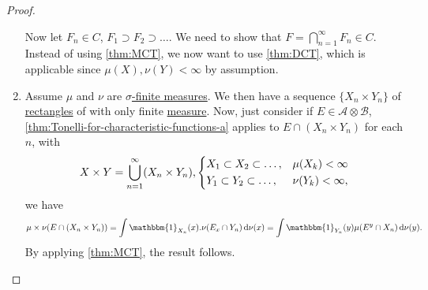 \begin{proof}
\begin{enumerate}
		      Now let \(F_{n} \in C\), \(F_1\supset F_2\supset \dots  \). We need to show that \(F = \bigcap_{n=1}^{\infty} F_{n} \in C\). Instead of using \autoref{thm:MCT}, we now want to use \autoref{thm:DCT}, which is applicable since \(\mu (X), \nu (Y)< \infty \) by assumption.
		\item Assume \(\mu\) and \(\nu \) are \hyperref[def:sigma-finite-measure]{\(\sigma \)-finite measures}. We then have a sequence \(\{X_n \times Y_n\}\) of \hyperref[def:rectangle]{rectangles} of with only finite \hyperref[def:measure]{measure}. Now, just consider if \(E\in \mathcal{A} \otimes \mathcal{B} \), \autoref{thm:Tonelli-for-characteristic-functions-a} applies to \(E \cap (X_{n} \times Y_{n} )\) for each \(n\), with
		      \[
			      X\times Y = \bigcup_{n=1}^{\infty} (X_{n} \times Y_{n} ), \begin{dcases}
				      X_1\subset X_2\subset \dots , & \mu (X_{k} )< \infty   \\
				      Y_1\subset Y_2\subset \dots , & \nu (Y_{k} )< \infty ,
			      \end{dcases}
		      \]
		      we have
		      \[
			      \mu \times \nu (E \cap (X_{n} \times Y_{n} )) = \int \mathbbm{1}_{X_{n} } (x) . \nu (E_{x} \cap Y_{n} )\,\mathrm{d} \nu (x) = \int \mathbbm{1}_{Y_{n} } (y)\mu (E^y \cap X_{n} )\,\mathrm{d} \nu (y).
		      \]
		      By applying \autoref{thm:MCT}, the result follows.
	\end{enumerate}
\end{proof}

